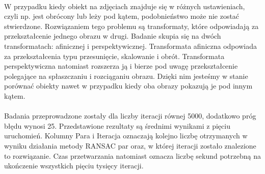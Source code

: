 \documentclass[../main.tex]{subfiles}
\begin{document}
   \paragraph{}
   W przypadku kiedy obiekt na zdjęciach znajduje się w różnych ustawieniach, czyli np. jest obrócony lub leży pod kątem, podobnieństwo może nie zostać stwierdzone. Rozwiązaniem tego problemu są transformaty, które odpowiadają za przekształcenie jednego obrazu w drugi. Badanie skupia się na dwóch transformatach: afinicznej i perspektywicznej. Transformata afiniczna odpowiada za przekształcenia typu przesunięcie, skalowanie i obrót. Transformata perspektywiczna natomiast rozszerza ją i bierze pod uwagę przekształcenie polegające na spłaszczaniu i rozciąganiu obrazu. Dzięki nim jesteśmy w stanie porównać obiekty nawet w przypadku kiedy oba obrazy pokazują je pod innym kątem.
    
    \paragraph{}
    Badania przeprowadzone zostały dla liczby iteracji równej 5000, dodatkowo próg błędu wynosi 25. Przedstawione rezultaty są średnimi wynikami z pięciu uruchomień. Kolumny Para i Iteracja oznaczają kolejno liczbę otrzymanych w wyniku działania metody RANSAC par oraz, w której iteracji zostało znalezione to rozwiązanie. Czas przetwarzania natomiast oznacza liczbę sekund potrzebną na ukończenie wszystkich pięciu tysięcy iteracji.
    
\end{document}
